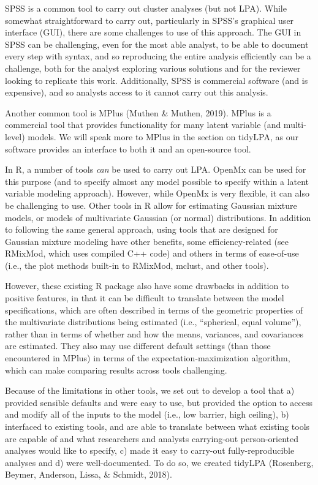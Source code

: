 \documentclass[english,man]{apa6}
\begin{document}
SPSS is a common tool to carry out cluster analyses (but not LPA). While
somewhat straightforward to carry out, particularly in SPSS's graphical user
interface (GUI), there are some challenges to use of this approach. The GUI in
SPSS can be challenging, even for the most able analyst, to be able to document
every step with syntax, and so reproducing the entire analysis efficiently can
be a challenge, both for the analyst exploring various solutions and for the
reviewer looking to replicate this work. Additionally, SPSS is commercial
software (and is expensive), and so analysts access to it cannot carry out this
analysis.

Another common tool is MPlus (Muthen \& Muthen, 2019). MPlus is a commercial tool
that provides functionality for many latent variable (and multi-level) models.
We will speak more to MPlus in the section on tidyLPA, as our software provides
an interface to both it and an open-source tool.

In R, a number of tools \emph{can} be used to carry out LPA. OpenMx can be used for
this purpose (and to specify almost any model possible to specify within a
latent variable modeling approach). However, while OpenMx is very flexible, it
can also be challenging to use. Other tools in R allow for estimating Gaussian
mixture models, or models of multivariate Gaussian (or normal) distributions. In
addition to following the same general approach, using tools that are designed
for Gaussian mixture modeling have other benefits, some efficiency-related (see
RMixMod, which uses compiled C++ code) and others in terms of ease-of-use (i.e.,
the plot methods built-in to RMixMod, mclust, and other tools).

However, these existing R package also have some drawbacks in addition to positive features, in that it can be difficult to translate between the model specifications, which are often described in terms of the geometric
properties of the multivariate distributions being estimated (i.e., \enquote{spherical,
equal volume}), rather than in terms of whether and how the means, variances,
and covariances are estimated. They also may use different default settings
(than those encountered in MPlus) in terms of the expectation-maximization
algorithm, which can make comparing results across tools challenging.

Because of the limitations in other tools, we set out to develop a tool that a)
provided sensible defaults and were easy to use, but provided the option to
access and modify all of the inputs to the model (i.e., low barrier, high
ceiling), b) interfaced to existing tools, and are able to translate between
what existing tools are capable of and what researchers and analysts
carrying-out person-oriented analyses would like to specify, c) made it easy to
carry-out fully-reproducible analyses and d) were well-documented. To do so, we
created tidyLPA (Rosenberg, Beymer, Anderson, Lissa, \& Schmidt, 2018).
\end{document}
